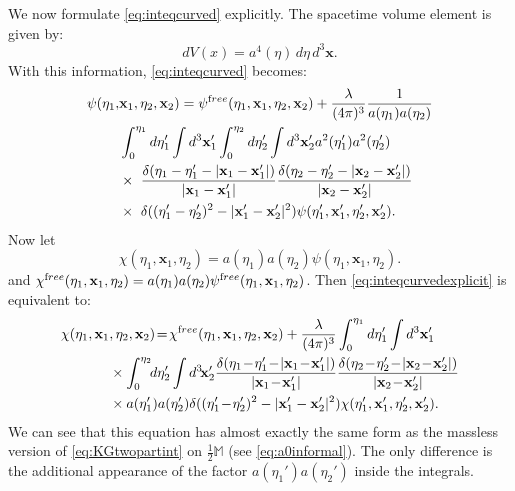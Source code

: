\documentclass[b5paper,draft,openbib,12pt]{memoir}
\newcommand{\M}{\mathbb{M}}
\newcommand{\vx}{\mathbf{x}}
\newcommand{\free}{{\textup free}}
\begin{document}
We now formulate \eqref{eq:inteqcurved} explicitly. 
The spacetime volume element is given by:
\begin{equation}
	dV(x) = a^4(\eta) \, d\eta \, d^3 \vx.
\end{equation}
With this information, \eqref{eq:inteqcurved} becomes:
\begin{align}
  \psi(\eta_1,&\vx_1,\eta_2,\vx_2) = \psi^\free(\eta_1,\vx_1,\eta_2,\vx_2) + \frac{\lambda}{(4\pi)^3} \frac{1}{a(\eta_1) a(\eta_2)} \notag\\
&\int_0^{\eta_1} d \eta_1' \int d^3 \vx_1' \int_0^{\eta_2} d \eta_2' \int d^3  \vx_2' a^2(\eta_1') a^2(\eta_2')\nonumber\\
&\times ~\frac{\delta(\eta_1-\eta_1' - |\vx_1-\vx_1'|)}{|\vx_1-\vx_1'|}\frac{\delta(\eta_2-\eta_2' - |\vx_2-\vx_2'|)}{|\vx_2-\vx_2'|}\nonumber\\
&\times ~\delta((\eta_1'-\eta_2')^2-|\vx_1'-\vx_2'|^2) \psi(\eta_1',\vx_1',\eta_2',\vx_2').
\label{eq:inteqcurvedexplicit}
\end{align}
Now let
\begin{equation}
	\chi(\eta_1,\vx_1,\eta_2) = a(\eta_1) a(\eta_2) \psi(\eta_1,\vx_1,\eta_2).
\end{equation}
and $\chi^\free(\eta_1,\vx_1,\eta_2) = a(\eta_1) a(\eta_2) \psi^\free(\eta_1,\vx_1,\eta_2)$.
Then \eqref{eq:inteqcurvedexplicit} is equivalent to:
\begin{align}\label{eq:inteqcurvedexplicitchi}
	\chi(\eta_1,\vx_1&,\eta_2,\vx_2)\! =\! \chi^\free(\eta_1,\vx_1,\eta_2,\vx_2) + \frac{\lambda}{(4\pi)^3} \int_0^{\eta_1} d \eta_1' \int d^3 \vx_1' \\
&\times \int_0^{\eta_2} \!\!d \eta_2' \int d^3\!  \vx_2' \frac{\delta(\eta_1\!-\!\eta_1'\! -\! |\vx_1\!-\!\vx_1'|)}{|\vx_1\!-\!\vx_1'|}\frac{\delta(\eta_2\!-\!\eta_2' \!-\! |\vx_2\!-\!\vx_2'|)}{|\vx_2\!-\!\vx_2'|}\nonumber\\
&\times  a(\eta_1') a(\eta_2') \delta((\eta_1'\!-\!\eta_2')^2-|\vx_1'-\vx_2'|^2) \chi(\eta_1',\vx_1',\eta_2',\vx_2').\notag
\end{align}
We can see that this equation has almost exactly the 
same form as the massless version of \eqref{eq:KGtwopartint} 
on $\tfrac{1}{2}\M$ (see \eqref{eq:a0informal}). The 
only difference is the additional appearance of the 
factor $a(\eta_1') a(\eta_2')$ inside the integrals.
\end{document}
